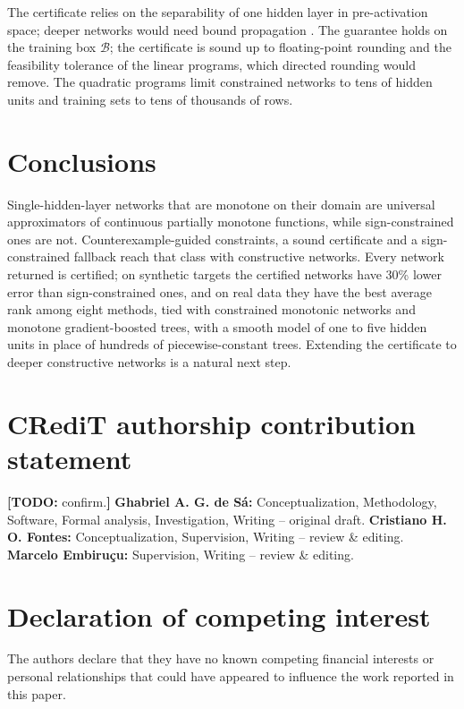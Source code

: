 \documentclass[preprint,12pt,authoryear]{elsarticle}
\newcommand{\todo}[1]{\textcolor{red!70!black}{\textbf{[TODO:} #1\textbf{]}}}
\newcommand{\B}{\mathcal{B}}
\begin{document}
The certificate relies on the separability of one hidden layer in pre-activation space; deeper networks would need
bound propagation \citep{Gowal2019,Liu2021verif}. The guarantee holds on the training box $\B$; the certificate is sound up to
floating-point rounding and the feasibility tolerance of the linear programs, which directed rounding would remove. The quadratic programs limit constrained networks to tens of hidden units and
training sets to tens of thousands of rows.

\section{Conclusions}\label{sec:conclusion}
Single-hidden-layer networks that are monotone on their domain are universal approximators of continuous partially
monotone functions, while sign-constrained ones are not. Counterexample-guided constraints, a sound certificate and a
sign-constrained fallback reach that class with constructive networks. Every network returned is certified; on
synthetic targets the certified networks have 30\% lower error than sign-constrained ones, and on real data they have the best
average rank among eight methods, tied with constrained monotonic networks and monotone gradient-boosted trees, with a
smooth model of one to five hidden units in place of hundreds of piecewise-constant trees. Extending the certificate to deeper
constructive networks is a natural next step.

\section*{CRediT authorship contribution statement}
\todo{confirm.} \textbf{Ghabriel A. G. de Sá:} Conceptualization, Methodology, Software, Formal analysis, Investigation,
Writing -- original draft. \textbf{Cristiano H. O. Fontes:} Conceptualization, Supervision, Writing -- review \& editing.
\textbf{Marcelo Embiruçu:} Supervision, Writing -- review \& editing.

\section*{Declaration of competing interest}
The authors declare that they have no known competing financial interests or personal relationships that could have
appeared to influence the work reported in this paper.
\end{document}
